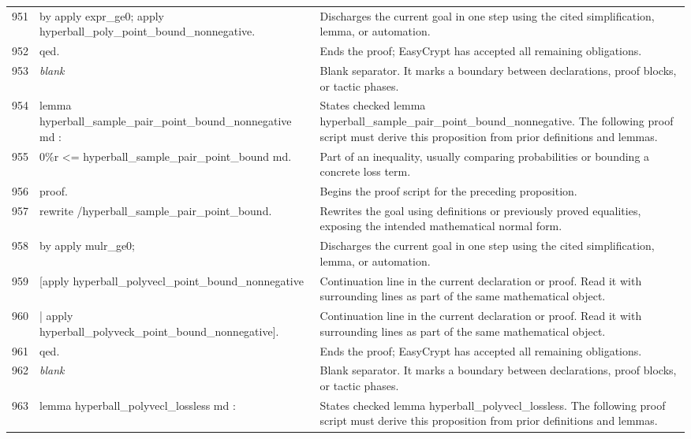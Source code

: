 \documentclass[10pt]{article}
\begin{document}
\begin{longtable}{r L{0.53\textwidth} L{0.37\textwidth}}
951 & {\ttfamily\scriptsize by apply expr\_ge0; apply hyperball\_poly\_point\_bound\_nonnegative.} & Discharges the current goal in one step using the cited simplification, lemma, or automation. \\
952 & {\ttfamily\scriptsize qed.} & Ends the proof; EasyCrypt has accepted all remaining obligations. \\
953 & {\ttfamily\scriptsize \emph{blank}} & Blank separator.  It marks a boundary between declarations, proof blocks, or tactic phases. \\
954 & {\ttfamily\scriptsize lemma hyperball\_sample\_pair\_point\_bound\_nonnegative md :} & States checked lemma hyperball\_sample\_pair\_point\_bound\_nonnegative.  The following proof script must derive this proposition from prior definitions and lemmas. \\
955 & {\ttfamily\scriptsize   0\%r <= hyperball\_sample\_pair\_point\_bound md.} & Part of an inequality, usually comparing probabilities or bounding a concrete loss term. \\
956 & {\ttfamily\scriptsize proof.} & Begins the proof script for the preceding proposition. \\
957 & {\ttfamily\scriptsize rewrite /hyperball\_sample\_pair\_point\_bound.} & Rewrites the goal using definitions or previously proved equalities, exposing the intended mathematical normal form. \\
958 & {\ttfamily\scriptsize by apply mulr\_ge0;} & Discharges the current goal in one step using the cited simplification, lemma, or automation. \\
959 & {\ttfamily\scriptsize    [apply hyperball\_polyvecl\_point\_bound\_nonnegative} & Continuation line in the current declaration or proof.  Read it with surrounding lines as part of the same mathematical object. \\
960 & {\ttfamily\scriptsize    | apply hyperball\_polyveck\_point\_bound\_nonnegative].} & Continuation line in the current declaration or proof.  Read it with surrounding lines as part of the same mathematical object. \\
961 & {\ttfamily\scriptsize qed.} & Ends the proof; EasyCrypt has accepted all remaining obligations. \\
962 & {\ttfamily\scriptsize \emph{blank}} & Blank separator.  It marks a boundary between declarations, proof blocks, or tactic phases. \\
963 & {\ttfamily\scriptsize lemma hyperball\_polyvecl\_lossless md :} & States checked lemma hyperball\_polyvecl\_lossless.  The following proof script must derive this proposition from prior definitions and lemmas. \\

\end{longtable}
\end{document}

